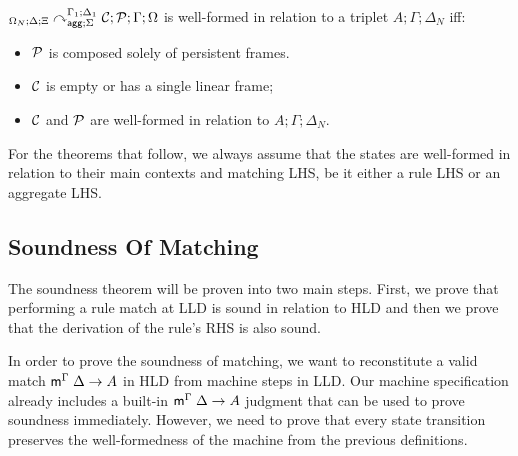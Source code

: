 \begin{definition}
${{}_{\Omega_N ; \Delta ; \Xi}\curvearrowright}_{\mathsf{agg} ; \Sigma}^{\Gamma_1; \Delta_1} \; \mathcal{C};
      \mathcal{P} ; \Gamma ; \Omega$
is well-formed in relation to a triplet $A; \Gamma; \Delta_{N}$ iff:

\begin{itemize}[leftmargin=*]
   \item $\mathcal{P}$ is composed solely of persistent frames.
   \item $\mathcal{C}$ is empty or has a single linear frame;
   \item $\mathcal{C}$ and $\mathcal{P}$ are well-formed in relation to $A; \Gamma; \Delta_{N}$.
\end{itemize}

\end{definition}

For the theorems that follow, we always assume that the states are
well-formed in relation to their main contexts and matching LHS, be it either a
rule LHS or an aggregate LHS.

\subsection{Soundness Of Matching}

The soundness theorem will be proven into two main steps. First, we prove that
performing a rule match at LLD is sound in relation to HLD and then we prove
that the derivation of the rule's RHS is also sound.

In order to prove the soundness of matching, we want to reconstitute a valid
match $\mathsf{m}^{\Gamma} \; \Delta \rightarrow A$ in HLD from machine steps in LLD. Our machine
specification already includes a built-in $\mathsf{m}^{\Gamma} \; \Delta \rightarrow A$ judgment that
can be used to prove soundness immediately. However, we need to prove that
every state transition preserves the well-formedness of the machine from the
previous definitions.

